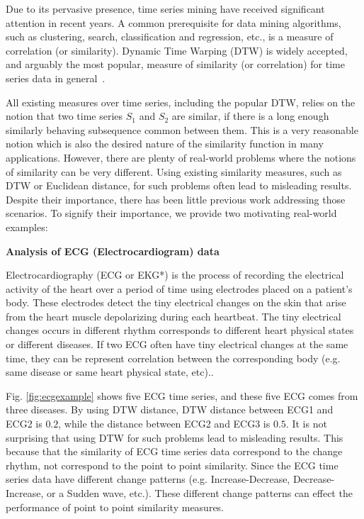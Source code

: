 Due to its pervasive presence, time series mining have received significant attention in recent years. A common prerequisite for data mining algorithms, such as clustering, search, classification and regression, etc., is a measure of correlation (or similarity). Dynamic Time Warping (DTW) is widely accepted, and arguably the most popular, measure of similarity (or correlation) for time series data in general~\cite{rakthanmanon2012searching, muller2007dynamic, chen2013dtw}.

All existing measures over time series, including the popular DTW, relies on the notion that two time series $S_1$ and $S_2$ are similar, if there is a long enough similarly behaving subsequence common between them. This is a very reasonable notion which is also the desired nature of the similarity function in many applications.  However, there are plenty of real-world problems where the notions of similarity can be very different. Using existing similarity measures, such as DTW or Euclidean distance, for such problems often lead to misleading results. Despite their importance, there has been little previous work addressing those scenarios. To signify their importance, we provide two motivating real-world examples:


\textbf{Analysis of ECG (Electrocardiogram) data}

Electrocardiography \cite{holter1961new} (ECG or EKG*)
is the process of recording the electrical activity of the heart over a period of time using electrodes placed on a patient's body.
These electrodes detect the tiny electrical changes on the skin that arise from the heart muscle depolarizing during each heartbeat.
The tiny electrical changes occurs in different rhythm corresponds to different heart physical states or different diseases. 
If two ECG often have tiny electrical changes at the same time, they can be represent correlation between the corresponding body (e.g. same disease or same heart physical state, etc).\cite{marriott1988practical}.


Fig. \ref{fig:ecgexample} shows five ECG time series, and these five ECG comes from three diseases.
By using DTW distance, DTW distance between ECG1 and ECG2 is $0.2$, while the distance between ECG2 and ECG3 is $0.5$.
It is not surprising that using DTW for such problems lead to misleading results.
This because that the similarity of ECG time series data correspond to the change rhythm, not correspond to the point to point similarity.
Since the ECG time series data have different change patterns (e.g. Increase-Decrease, Decrease-Increase, or a Sudden wave, etc.). These different change patterns can effect the performance of point to point similarity measures.

